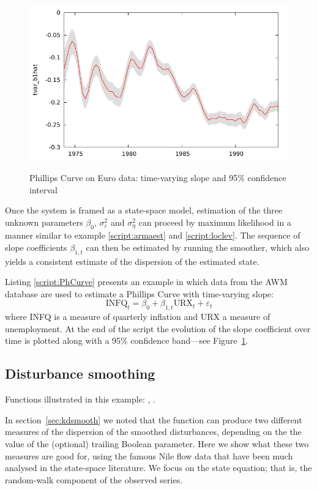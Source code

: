 \begin{figure}[htbp]
  \centering
    \includegraphics{figures/timevar_PhCurve} \\[10pt]
  \caption{Phillips Curve on Euro data: time-varying slope and
    95\% confidence interval}
  \label{fig:tvar}
\end{figure}

Once the system is framed as a state-space model, estimation of the
three unknown parameters $\beta_0$, $\sigma^2_{\varepsilon}$ and
$\sigma^2_{\eta}$ can proceed by maximum likelihood in a manner
similar to example \ref{script:armaest} and \ref{script:loclev}. The
sequence of slope coefficients $\beta_{1,t}$ can then be estimated by
running the smoother, which also yields a consistent estimate of the
dispersion of the estimated state.

Listing \ref{script:PhCurve} presents an example in which data from
the AWM database are used to estimate a Phillips Curve with
time-varying slope:
\[
\mbox{INFQ}_t = \beta_0 + \beta_{1,t} \mbox{URX}_t + \varepsilon_t
\]
where INFQ is a measure of quarterly inflation and URX a measure of
unemployment.  At the end of the script the evolution of the slope
coefficient over time is plotted along with a 95\% confidence
band---see Figure~\ref{fig:tvar}.


\subsection{Disturbance smoothing}
\label{sec:example_dsmooth}

Functions illustrated in this example: , .

In section~\ref{sec:kdsmooth} we noted that the 
function can produce two different measures of the dispersion of the
smoothed disturbances, depending on the the value of the (optional)
trailing Boolean parameter. Here we show what these two measures are
good for, using the famous Nile flow data that have been much analysed
in the state-space literature. We focus on the state equation; that
is, the random-walk component of the observed series.

